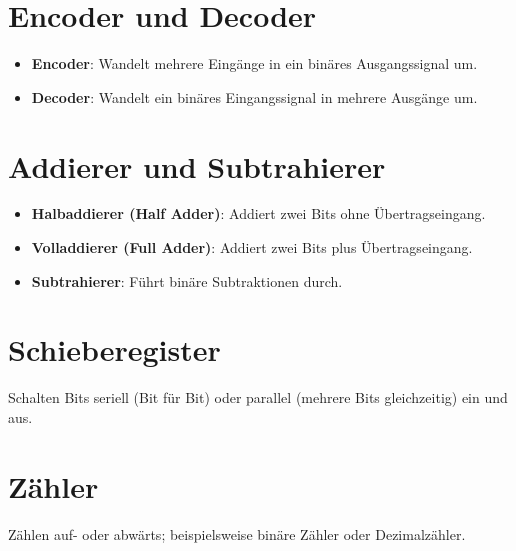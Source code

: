 \documentclass[a4paper,12pt]{article}
\begin{document}
	\section{Encoder und Decoder}
	\begin{itemize}
		\item \textbf{Encoder}: Wandelt mehrere Eingänge in ein binäres Ausgangssignal um.
		\item \textbf{Decoder}: Wandelt ein binäres Eingangssignal in mehrere Ausgänge um.
	\end{itemize}
	
	\section{Addierer und Subtrahierer}
	\begin{itemize}
		\item \textbf{Halbaddierer (Half Adder)}: Addiert zwei Bits ohne Übertragseingang.
		\item \textbf{Volladdierer (Full Adder)}: Addiert zwei Bits plus Übertragseingang.
		\item \textbf{Subtrahierer}: Führt binäre Subtraktionen durch.
	\end{itemize}
	
	\section{Schieberegister}
	Schalten Bits seriell (Bit für Bit) oder parallel (mehrere Bits gleichzeitig) ein und aus.
	
	\section{Zähler}
	Zählen auf- oder abwärts; beispielsweise binäre Zähler oder Dezimalzähler.
	
\end{document}
